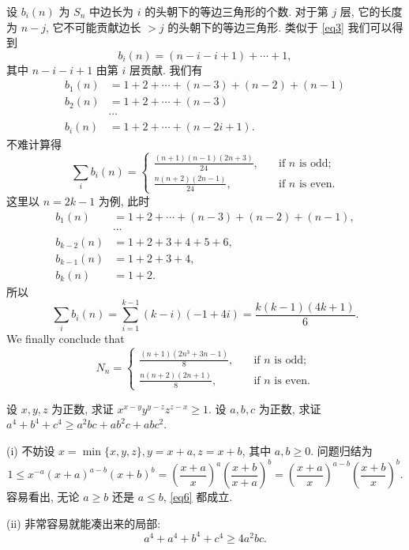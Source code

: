 \documentclass{article}
\begin{document}
\begin{soln}
设 $b_i(n)$ 为 $S_n$ 中边长为 $i$ 的头朝下的等边三角形的个数.
对于第 $j$ 层, 它的长度为 $n-j$,
它不可能贡献边长 $> j$ 的头朝下的等边三角形.
类似于 \cref{eq3} 我们可以得到
\begin{equation}
\label{eq4}
b_i(n) = (n-i-i+1) + \cdots + 1,
\end{equation}
其中 $n-i-i+1$ 由第 $i$ 层贡献. 我们有
\begin{align*}
b_1(n) &= 1 + 2 + \cdots + (n-3) + (n-2) + (n-1)\\
b_2(n) &= 1 + 2 + \cdots + (n-3)\\
&\cdots\\
b_i(n) &= 1 + 2 + \cdots + (n-2i+1).
\end{align*}
不难计算得
\begin{equation}
\label{eq5}
\sum_i b_i(n) = \begin{cases}
\frac{(n+1)(n-1)(2n+3)}{24}, \quad &\text{if $n$ is odd};\\
\frac{n(n+2)(2n-1)}{24}, \quad &\text{if $n$ is even}.
\end{cases}
\end{equation}
这里以 $n = 2k-1$ 为例, 此时
\begin{align*}
b_1(n) &= 1 + 2 + \cdots + (n-3) + (n-2) + (n-1),\\
&\cdots\\
b_{k-2}(n) &= 1 + 2 + 3 + 4 + 5 + 6,\\
b_{k-1}(n) &= 1 + 2 + 3 + 4,\\
b_{k}(n) &= 1 + 2.
\end{align*}
所以
\[\sum_i b_i(n) = \sum_{i=1}^{k-1}(k-i)(-1+4i)=\frac{k(k-1)(4k+1)}{6}.\]
We finally conclude that
\[\boxed{N_n = \begin{cases}
\frac{(n+1)(2n^3 + 3n - 1)}{8}, \quad &\text{if $n$ is odd};\\
\frac{n(n+2)(2n+1)}{8}, \quad &\text{if $n$ is even}.
\end{cases}}\]
\end{soln}

\begin{prob}
\begin{enumerate}[label=(\roman*)]
\ii 设 $x,y,z$ 为正数, 求证 $x^{x-y}y^{y-z}z^{z-x} \ge 1$.
\ii 设 $a,b,c$ 为正数, 求证 $a^4 + b^4 + c^4 \ge a^2bc + ab^2c + abc^2$.
\end{enumerate}
\end{prob}

\begin{soln}
(i) 不妨设 $x=\min\{x,y,z\}, y=x+a, z=x+b$, 其中 $a,b \ge 0$.
问题归结为
\begin{equation}
\label{eq6}
1 \le x^{-a}(x+a)^{a-b}(x+b)^b = \left(\frac{x+a}{x}\right)^a\left(\frac{x+b}{x+a}\right)^b = \left(\frac{x+a}{x}\right)^{a-b}\left(\frac{x+b}{x}\right)^b.
\end{equation}
容易看出, 无论 $a \ge b$ 还是 $a \le b$, \cref{eq6} 都成立.

(ii) 非常容易就能凑出来的局部:
\begin{equation}
\label{eq7}
a^4 + a^4 + b^4 + c^4 \ge 4a^2bc.
\end{equation}
\end{soln}
\end{document}
